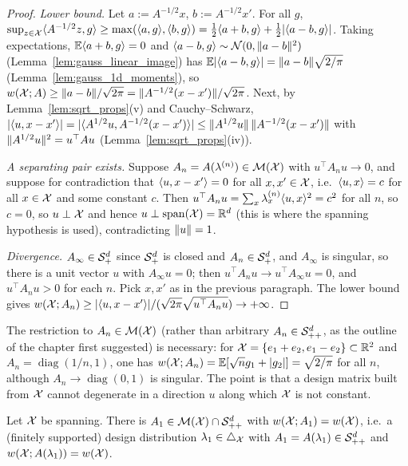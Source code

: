 \begin{proof}
\emph{Lower bound.} Let $a := A^{-1/2}x$, $b := A^{-1/2}x'$. For all $g$,
$\sup_{z\in\mathcal{X}}\langle A^{-1/2}z, g \rangle \ge \max(\langle a, g \rangle,\langle b, g \rangle) = \tfrac12\langle a+b, g \rangle +
\tfrac12\lvert \langle a-b, g \rangle \rvert$. Taking expectations, $\mathbb{E}\langle a+b, g \rangle = 0$ and $\langle a-b, g \rangle \sim
\mathcal{N}(0,\lVert a-b \rVert^2)$ (Lemma~\ref{lem:gauss_linear_image}) has $\mathbb{E}\lvert \langle a-b, g \rangle \rvert =
\lVert a-b \rVert\sqrt{2/\pi}$ (Lemma~\ref{lem:gauss_1d_moments}), so $w(\mathcal{X};A) \ge
\lVert a-b \rVert/\sqrt{2\pi} = \lVert A^{-1/2}(x-x') \rVert/\sqrt{2\pi}$. Next, by
Lemma~\ref{lem:sqrt_props}(v) and Cauchy--Schwarz,
$\lvert \langle u, x-x' \rangle \rvert = \lvert \langle A^{1/2}u, A^{-1/2}(x-x') \rangle \rvert \le \lVert A^{1/2}u \rVert\,\lVert A^{-1/2}(x-x') \rVert$
with $\lVert A^{1/2}u \rVert^2 = u^\top A u$ (Lemma~\ref{lem:sqrt_props}(iv)).

\emph{A separating pair exists.} Suppose $A_n = A(\lambda^{(n)}) \in \mathcal{M}(\mathcal{X})$ with
$u^\top A_n u \to 0$, and suppose for contradiction that $\langle u, x - x' \rangle = 0$ for all
$x, x' \in \mathcal{X}$, i.e.\ $\langle u, x \rangle = c$ for all $x \in \mathcal{X}$ and some constant $c$. Then
$u^\top A_nu = \sum_x\lambda^{(n)}_x\langle u, x \rangle^2 = c^2$ for all $n$, so $c = 0$, so $u \perp \mathcal{X}$
and hence $u \perp \operatorname{span}(\mathcal{X}) = \mathbb{R}^d$ (this is where the spanning hypothesis is used),
contradicting $\lVert u \rVert = 1$.

\emph{Divergence.} $A_\infty \in \mathcal{S}_{+}^{d}$ since $\mathcal{S}_{+}^{d}$ is closed and $A_n \in \mathcal{S}_{+}^{d}$, and $A_\infty$
is singular, so there is a unit vector $u$ with $A_\infty u = 0$; then $u^\top A_nu \to
u^\top A_\infty u = 0$, and $u^\top A_n u > 0$ for each $n$. Pick $x, x'$ as in the previous
paragraph. The lower bound gives $w(\mathcal{X};A_n) \ge \lvert \langle u, x-x' \rangle \rvert/(\sqrt{2\pi}\sqrt{u^\top A_nu})
\to +\infty$.
\end{proof}

\begin{remark}
The restriction to $A_n \in \mathcal{M}(\mathcal{X})$ (rather than arbitrary $A_n \in \mathcal{S}_{++}^{d}$, as the
outline of the chapter first suggested) is necessary: for $\mathcal{X} = \{e_1 + e_2, e_1 - e_2\}
\subset \mathbb{R}^2$ and $A_n = \operatorname{diag}(1/n, 1)$, one has $w(\mathcal{X};A_n) =
\mathbb{E}[\sqrt n g_1 + \lvert g_2 \rvert] = \sqrt{2/\pi}$ for all $n$, although $A_n \to \operatorname{diag}(0,1)$
is singular. The point is that a design matrix built from $\mathcal{X}$ cannot degenerate in a direction
$u$ along which $\mathcal{X}$ is not constant.
\end{remark}

\begin{lemma}\label{lem:width_attained}
Let $\mathcal{X}$ be spanning. There is $A_1 \in \mathcal{M}(\mathcal{X})\cap\mathcal{S}_{++}^{d}$ with $w(\mathcal{X};A_1) = w(\mathcal{X})$,
i.e.\ a (finitely supported) design distribution $\lambda_1 \in \triangle_{\mathcal{X}}$ with
$A_1 = A(\lambda_1) \in \mathcal{S}_{++}^{d}$ and $w(\mathcal{X};A(\lambda_1)) = w(\mathcal{X})$.
\end{lemma}

